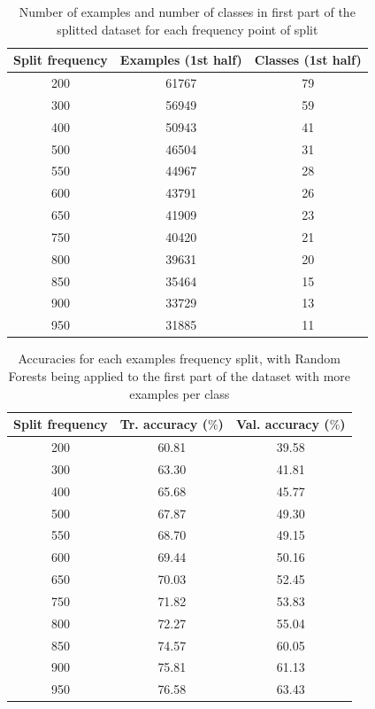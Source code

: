 \documentclass[10pt,twocolumn,letterpaper]{article}
\begin{document}
\begin{table}[h!]
  \begin{center}
    \label{tab:freqs_splitted_first}
    \begin{tabular}{c|c|c} %
      \textbf{Split frequency} & \textbf{Examples (1st half)} & \textbf{Classes (1st half)}\\
      \hline
      200 & 61767 & 79\\
      300 & 56949 & 59\\
      400 & 50943 & 41\\
      500 & 46504 & 31\\
      550 & 44967 & 28\\
      600 & 43791 & 26\\
      650 & 41909 & 23\\
      750 & 40420 & 21\\
      800 & 39631 & 20\\
      850 & 35464 & 15\\
      900 & 33729 & 13\\
      950 & 31885 & 11\\
    \end{tabular}
    \caption{Number of examples and number of classes in first part of the splitted dataset for each frequency point of split}
  \end{center}
\end{table}

\begin{table}[h!]
  \begin{center}
    \label{tab:rf_splitted_first}
    \begin{tabular}{c|c|c} %
      \textbf{Split frequency} & \textbf{Tr. accuracy ($\%$)} & \textbf{Val. accuracy ($\%$)}\\
      \hline
      200 & 60.81 & 39.58\\
      300 & 63.30 & 41.81\\
      400 & 65.68 & 45.77\\
      500 & 67.87 & 49.30\\
      550 & 68.70 & 49.15\\
      600 & 69.44 & 50.16\\
      650 & 70.03 & 52.45\\
      750 & 71.82 & 53.83\\
      800 & 72.27 & 55.04\\
      850 & 74.57 & 60.05\\
      900 & 75.81 & 61.13\\
      950 & 76.58 & 63.43\\
    \end{tabular}
    \caption{Accuracies for each examples frequency split, with Random Forests being applied to the first part of the dataset with more examples per class}
  \end{center}
\end{table}
\end{document}
